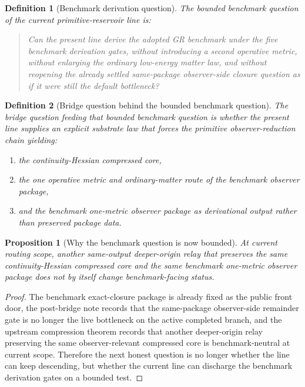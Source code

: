 \documentclass[11pt]{article}
\newtheorem{definition}{Definition}
\newtheorem{proposition}{Proposition}
\begin{document}
\begin{definition}[Benchmark derivation question]
The \emph{bounded benchmark question} of the current primitive-reservoir line is:
\begin{quote}
Can the present line derive the adopted GR benchmark under the five benchmark derivation gates, without introducing a second operative metric, without enlarging the ordinary low-energy matter law, and without reopening the already settled same-package observer-side closure question as if it were still the default bottleneck?
\end{quote}
\end{definition}

\begin{definition}[Bridge question behind the bounded benchmark question]
The \emph{bridge question} feeding that bounded benchmark question is whether the present line supplies an explicit substrate law that forces the primitive observer-reduction chain yielding:
\begin{enumerate}
    \item the continuity-Hessian compressed core,
    \item the one operative metric and ordinary-matter route of the benchmark observer package,
    \item and the benchmark one-metric observer package as derivational output rather than preserved package data.
\end{enumerate}
\end{definition}

\begin{proposition}[Why the benchmark question is now bounded]
At current routing scope, another same-output deeper-origin relay that preserves the same continuity-Hessian compressed core and the same benchmark one-metric observer package does not by itself change benchmark-facing status.
\end{proposition}

\begin{proof}
The benchmark exact-closure package is already fixed as the public front door, the post-bridge note records that the same-package observer-side remainder gate is no longer the live bottleneck on the active completed branch, and the upstream compression theorem records that another deeper-origin relay preserving the same observer-relevant compressed core is benchmark-neutral at current scope. Therefore the next honest question is no longer whether the line can keep descending, but whether the current line can discharge the benchmark derivation gates on a bounded test.
\end{proof}
\end{document}
